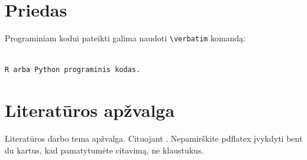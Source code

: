 \documentclass[11pt]{article}
\begin{document}

\section{Priedas}
Programiniam kodui pateikti galima naudoti  \verb|\verbatim| komandą:
\small  %
\begin{verbatim}

R arba Python programinis kodas.

\end{verbatim}



\section{Literatūros apžvalga}
Literatūros darbo tema apžvalga. Cituojant \cite{YLS16,KGDD08}. Nepamirškite pdflatex įvykdyti bent du kartus, kad pamatytumėte citavimą, ne klaustukus.
\end{document}
